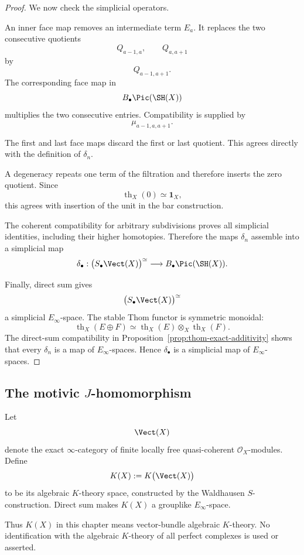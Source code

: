 \begin{proof}
We now check the simplicial operators.

An inner face map removes an intermediate term \(E_a\).  It replaces the
two consecutive quotients
\[
    Q_{a-1,a},
    \qquad
    Q_{a,a+1}
\]
by
\[
    Q_{a-1,a+1}.
\]
The corresponding face map in
\[
    B_\bullet\Pic(\SH(X))
\]
multiplies the two consecutive entries.  Compatibility is supplied by
\[
    \mu_{a-1,a,a+1}.
\]

The first and last face maps discard the first or last quotient.  This
agrees directly with the definition of \(\delta_n\).

A degeneracy repeats one term of the filtration and therefore inserts the
zero quotient.  Since
\[
    \operatorname{th}_X(0)
    \simeq
    \mathbf1_X,
\]
this agrees with insertion of the unit in the bar construction.

The coherent compatibility for arbitrary subdivisions proves all simplicial
identities, including their higher homotopies.  Therefore the maps
\(\delta_n\) assemble into a simplicial map
\[
    \delta_\bullet:
    \bigl(
      S_\bullet\Vect(X)
    \bigr)^\simeq
    \longrightarrow
    B_\bullet\Pic(\SH(X)).
\]

Finally, direct sum gives
\[
    \bigl(
      S_\bullet\Vect(X)
    \bigr)^\simeq
\]
a simplicial \(E_\infty\)-space.  The stable Thom functor is symmetric
monoidal:
\[
    \operatorname{th}_X(E\oplus F)
    \simeq
    \operatorname{th}_X(E)
    \otimes_X
    \operatorname{th}_X(F).
\]
The direct-sum compatibility in
Proposition~\ref{prop:thom-exact-additivity} shows that every
\(\delta_n\) is a map of \(E_\infty\)-spaces.  Hence
\(\delta_\bullet\) is a simplicial map of \(E_\infty\)-spaces.
\end{proof}

\subsection{The motivic $J$-homomorphism}

\begin{definition}
\label{def:vector-bundle-K-theory}
Let
\[
    \Vect(X)
\]
denote the exact \(\infty\)-category of finite locally free
quasi-coherent \(\mathcal O_X\)-modules.  Define
\[
    K(X)
    :=
    K\bigl(\Vect(X)\bigr)
\]
to be its algebraic \(K\)-theory space, constructed by the Waldhausen
\(S\)-construction.  Direct sum makes \(K(X)\) a grouplike
\(E_\infty\)-space.

Thus \(K(X)\) in this chapter means vector-bundle algebraic \(K\)-theory.
No identification with the algebraic \(K\)-theory of all perfect complexes is
used or asserted.
\end{definition}

